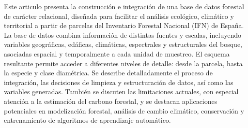 

Este articulo presenta la construcción e integración de una base de datos forestal de carácter relacional, diseñada para facilitar el análisis ecológico, climático y territorial a partir de parcelas del Inventario Forestal Nacional (IFN) de España. La base de datos combina información de distintas fuentes y escalas, incluyendo variables geográficas, edáficas, climáticas, espectrales y estructurales del bosque, asociadas espacial y temporalmente a cada unidad de muestreo. El esquema resultante permite acceder a diferentes niveles de detalle: desde la parcela, hasta la especie y clase diamétrica. Se describe detalladamente el proceso de integración, las decisiones de limpieza y estructuración de datos, así como las variables generadas. También se discuten las limitaciones actuales, con especial atención a la estimación del carbono forestal, y se destacan aplicaciones potenciales en modelización forestal, análisis de cambio climático, conservación y entrenamiento de algoritmos de aprendizaje automático.

